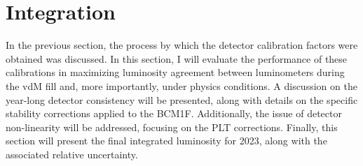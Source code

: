 	

\section{Integration}

In the previous section, the process by which the detector calibration factors were obtained was discussed. In this section, I will evaluate the performance of these calibrations in maximizing luminosity agreement between luminometers during the vdM fill and, more importantly, under physics conditions. A discussion on the year-long detector consistency will be presented, along with details on the specific stability corrections applied to the BCM1F. Additionally, the issue of detector non-linearity will be addressed, focusing on the PLT corrections. Finally, this section will present the final integrated luminosity for 2023, along with the associated relative uncertainty.


